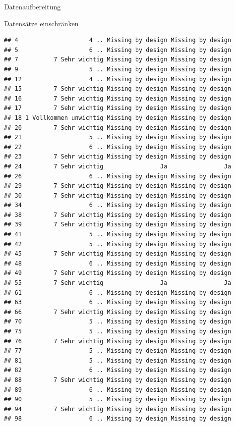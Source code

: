 \documentclass[ignorenonframetext,]{beamer}
\begin{document}
\begin{frame}[fragile]{Datenaufbereitung}
\begin{block}{Datensätze einschränken}
\begin{verbatim}
## 4                    4 .. Missing by design Missing by design
## 5                    6 .. Missing by design Missing by design
## 7          7 Sehr wichtig Missing by design Missing by design
## 9                    5 .. Missing by design Missing by design
## 12                   4 .. Missing by design Missing by design
## 15         7 Sehr wichtig Missing by design Missing by design
## 16         7 Sehr wichtig Missing by design Missing by design
## 17         7 Sehr wichtig Missing by design Missing by design
## 18 1 Vollkommen unwichtig Missing by design Missing by design
## 20         7 Sehr wichtig Missing by design Missing by design
## 21                   5 .. Missing by design Missing by design
## 22                   6 .. Missing by design Missing by design
## 23         7 Sehr wichtig Missing by design Missing by design
## 24         7 Sehr wichtig                Ja                Ja
## 26                   6 .. Missing by design Missing by design
## 29         7 Sehr wichtig Missing by design Missing by design
## 30         7 Sehr wichtig Missing by design Missing by design
## 34                   6 .. Missing by design Missing by design
## 38         7 Sehr wichtig Missing by design Missing by design
## 39         7 Sehr wichtig Missing by design Missing by design
## 41                   5 .. Missing by design Missing by design
## 42                   5 .. Missing by design Missing by design
## 45         7 Sehr wichtig Missing by design Missing by design
## 48                   6 .. Missing by design Missing by design
## 49         7 Sehr wichtig Missing by design Missing by design
## 55         7 Sehr wichtig                Ja                Ja
## 61                   6 .. Missing by design Missing by design
## 63                   6 .. Missing by design Missing by design
## 66         7 Sehr wichtig Missing by design Missing by design
## 70                   5 .. Missing by design Missing by design
## 75                   5 .. Missing by design Missing by design
## 76         7 Sehr wichtig Missing by design Missing by design
## 77                   5 .. Missing by design Missing by design
## 81                   5 .. Missing by design Missing by design
## 82                   6 .. Missing by design Missing by design
## 88         7 Sehr wichtig Missing by design Missing by design
## 89                   6 .. Missing by design Missing by design
## 90                   5 .. Missing by design Missing by design
## 94         7 Sehr wichtig Missing by design Missing by design
## 98                   6 .. Missing by design Missing by design
\end{verbatim}


\end{block}
\end{frame}
\end{document}
